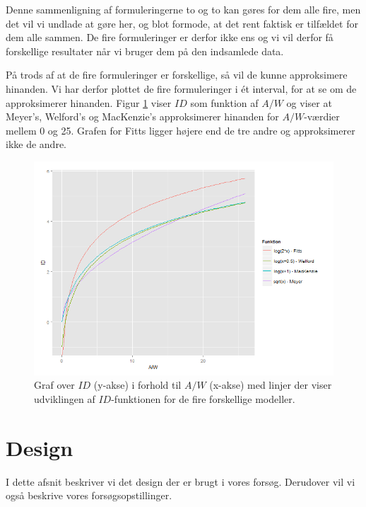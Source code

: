 Denne sammenligning af formuleringerne to og to kan gøres for dem alle fire, men det vil vi undlade at gøre her, og blot formode, at det rent faktisk er tilfældet for dem alle sammen. De fire formuleringer er derfor ikke ens og vi vil derfor få forskellige resultater når vi bruger dem på den indsamlede data.

På trods af at de fire formuleringer er forskellige, så vil de kunne approksimere hinanden. Vi har derfor plottet de fire formuleringer i ét interval, for at se om de approksimerer hinanden. Figur \ref{fig:Sammenligning} viser $ID$ som funktion af $A/W$ og viser at Meyer's, Welford's og MacKenzie's approksimerer hinanden for $A/W$-værdier mellem 0 og 25. Grafen for Fitts ligger højere end de tre andre og approksimerer ikke de andre.

\begin{figure}[h]
\centering
\includegraphics[width=\linewidth]{images/plots/plot_comparison_id}
\caption{Graf over $ID$ (y-akse) i forhold til $A/W$ (x-akse) med linjer der viser udviklingen af $ID$-funktionen for de fire forskellige modeller.}
\label{fig:Sammenligning}
\end{figure}

\chapter*{Design}
I dette afsnit beskriver vi det design der er brugt i vores forsøg. Derudover vil vi også beskrive vores forsøgsopstillinger.


